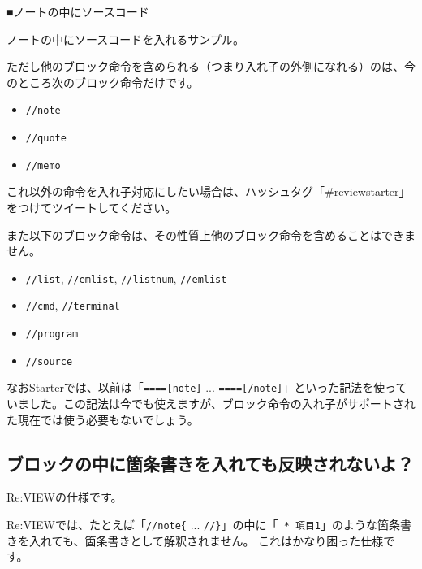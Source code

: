 \starterresult
\begin{starternote}{■ノートの中にソースコード}
\begin{starternoteinner}

ノートの中にソースコードを入れるサンプル。

\label{}
\end{starternoteinner}
\begin{starterprogram}\end{starterprogram}
\end{starternote}
\endstarterresult

ただし他のブロック命令を含められる（つまり入れ子の外側になれる）のは、今のところ次のブロック命令だけです。

\begin{itemize}
\item \texttt{//note}
\item \texttt{//quote}
\item \texttt{//memo}
\end{itemize}

これ以外の命令を入れ子対応にしたい場合は、ハッシュタグ「\#reviewstarter」をつけてツイートしてください。

また以下のブロック命令は、その性質上他のブロック命令を含めることはできません。

\begin{itemize}
\item \texttt{//list}, \texttt{//emlist}, \texttt{//listnum}, \texttt{//emlist}
\item \texttt{//cmd}, \texttt{//terminal}
\item \texttt{//program}
\item \texttt{//source}
\end{itemize}

なおStarterでは、以前は「\texttt{====[note]} ... \texttt{====[/note]}」といった記法を使っていました。この記法は今でも使えますが、ブロック命令の入れ子がサポートされた現在では使う必要もないでしょう。

\subsection{ブロックの中に箇条書きを入れても反映されないよ？}
\label{sec:2-3-2}
\label{subsec-faq-block2}

Re:VIEWの仕様です。

Re:VIEWでは、たとえば「\texttt{//note\{} ... \texttt{//\}}」の中に「\texttt{ * 項目1}」のような箇条書きを入れても、箇条書きとして解釈されません。
これはかなり困った仕様です。


